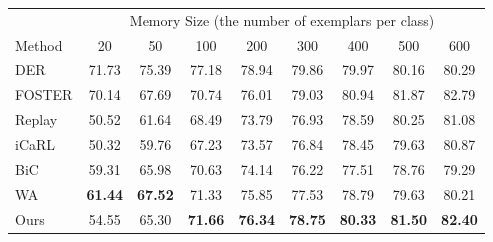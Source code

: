 \centering
\begin{tabular}{l|cccccccc}
\toprule
\multicolumn{1}{l|}{} & \multicolumn{8}{c}{Memory Size (the number of exemplars per class)} \\
\cmidrule(l){2-9}
Method & 20 & 50 & 100 & 200 & 300 & 400 & 500 & 600\\
\midrule
DER    & 71.73 & 75.39 & 77.18 & 78.94 & 79.86 & 79.97 &  80.16 & 80.29\\
FOSTER & 70.14 & 67.69 & 70.74 & 76.01 & 79.03 & 80.94 &  81.87 & 82.79 \\
\midrule
Replay & 50.52 & 61.64 & 68.49 & 73.79 & 76.93 & 78.59 & 80.25 & 81.08\\
iCaRL  & 50.32 & 59.76 & 67.23 & 73.57 & 76.84 & 78.45 & 79.63 & 80.87\\
BiC    & 59.31 & 65.98 & 70.63 & 74.14 & 76.22& 77.51 &  78.76 & 79.29 \\
WA     & \bf{61.44} & \bf{67.52} & 71.33 & 75.85 & 77.53 & 78.79&   79.63 & 80.21\\
\midrule
Ours   & 54.55 & 65.30 & \bf{71.66} & \bf{76.34} & \bf{78.75} & \bf{80.33} & \bf{81.50}  & \bf{82.40}\\
\bottomrule
\end{tabular}

\begin{comment}

\begin{tabular}{@{}l|rrrrrrr@{}} %
\toprule
\textbf{Memory Size} & BIC & DER & Foster & iCarl & WA & Replay & Ours \\
\midrule
20  & 54.28 & 64.30 & 65.83 & 49.56 & 60.87 & 48.92 & 52.25\\
40  & 60.48 & 67.56& 64.95& 57.74& 64.15& 56.59& 59.94\\
60  & & & & & & &  \\
80  & & & & & & &   \\
100  & & & & & &  &  \\
120  & & & & & & & \\
140  & & & & &  & &  \\
160  & & & & &  & &  \\
180  & & & & & & &  \\
200  & & & &  & & &  \\
220  & & & &  & & &  \\
240  & & & &  & & &  \\
260  & & & &  & & &  \\
280  & & & &  & & &  \\
300  & & & &  & & &  \\
350  & & & &  & & & \\
400  & & & &  & & & \\
450  & & & &  & & &  \\
500  & & & &  & & & \\


\bottomrule
\end{tabular}
\end{comment}

